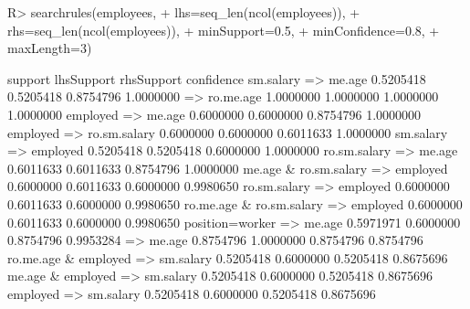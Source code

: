 \begin{Schunk}
% --begin: "searchrules"
\begin{Sinput}
R> searchrules(employees,
+              lhs=seq_len(ncol(employees)),
+              rhs=seq_len(ncol(employees)),
+              minSupport=0.5,
+              minConfidence=0.8,
+              maxLength=3)
\end{Sinput}
\begin{Soutput}
                                       support lhsSupport rhsSupport confidence
sm.salary => me.age                  0.5205418  0.5205418  0.8754796  1.0000000
 => ro.me.age                        1.0000000  1.0000000  1.0000000  1.0000000
employed => me.age                   0.6000000  0.6000000  0.8754796  1.0000000
employed => ro.sm.salary             0.6000000  0.6000000  0.6011633  1.0000000
sm.salary => employed                0.5205418  0.5205418  0.6000000  1.0000000
ro.sm.salary => me.age               0.6011633  0.6011633  0.8754796  1.0000000
me.age & ro.sm.salary => employed    0.6000000  0.6011633  0.6000000  0.9980650
ro.sm.salary => employed             0.6000000  0.6011633  0.6000000  0.9980650
ro.me.age & ro.sm.salary => employed 0.6000000  0.6011633  0.6000000  0.9980650
position=worker => me.age            0.5971971  0.6000000  0.8754796  0.9953284
 => me.age                           0.8754796  1.0000000  0.8754796  0.8754796
ro.me.age & employed => sm.salary    0.5205418  0.6000000  0.5205418  0.8675696
me.age & employed => sm.salary       0.5205418  0.6000000  0.5205418  0.8675696
employed => sm.salary                0.5205418  0.6000000  0.5205418  0.8675696
\end{Soutput}
%
% --end: "searchrules"
\end{Schunk}
